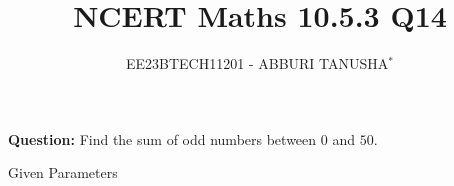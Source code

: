 \documentclass[journal,12pt,twocolumn]{IEEEtran}
\theoremstyle{remark}
\begin{document}

\vspace{3cm}
	\title{NCERT Maths 10.5.3 Q14}
	\author{EE23BTECH11201 - ABBURI TANUSHA$^{*}$%
	}
\maketitle
\newpage
\bigskip

\renewcommand{\thefigure}{\theenumi}
\renewcommand{\thetable}{\theenumi}

\vspace{3cm}
\maketitle
\textbf{Question:} 
Find the sum of odd numbers between $0$ and $50$.

\solution
\fi
\begin{table}[h!]
	\centering
	 \resizebox{6cm}{!}{
	 	
	 	}
	 	\caption{Given Parameters}
	 	\label{tab:ansh_tabel}
 \end{table}
\end{document}
